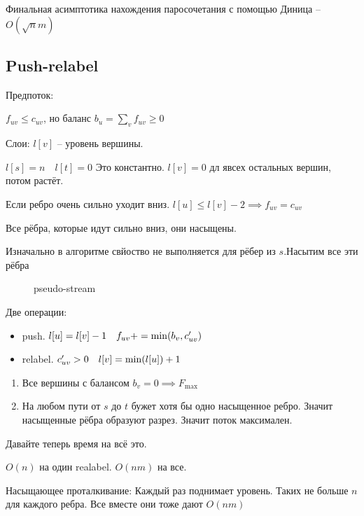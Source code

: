 Финальная асимптотика нахождения паросочетания с помощью Диница -- $O(\sqrt{n}m)$

\subsection{Push-relabel}

\begin{definition}
    Предпоток:

    $f_{uv} \leqslant c_{uv}$, но баланс $b_u = \sum_v f_{uv} \geqslant 0$

    Слои: $l[v] $ -- уровень вершины.

    $l[s] = n\quad l[t] = 0$ Это константно. $l[v] = 0$ дл явсех остальных вершин, потом растёт.
\end{definition}

\begin{property}
    Если ребро очень сильно уходит вниз. $l[u] \leqslant l[v] -2 \implies f_{uv} = c_{uv}$

    Все рёбра, которые идут сильно вниз, они насыщены.
\end{property}

Изначально в алгоритме свйоство не выполняется для рёбер из $s$.Насытим все эти рёбра

\begin{figure}[!ht]
    \centering
    \caption{pseudo-stream}
    \label{fig:pseudo-stream}
\end{figure}

Две операции:
\begin{itemize}
    \item push. $l[u] = l[v] - 1\quad f_{uv} += \min(b_v, c^{\prime}_{uv})$
    \item relabel. $c^{\prime}_{uv} > 0\quad l[v] = \min(l[u]) + 1$
\end{itemize}

\begin{enumerate}
    \item Все вершины с балансом $b_v = 0 \implies F_{\max}$
    \item На любом пути от $s$ до $t$ бужет хотя бы одно насыщенное ребро. Значит насыщенные рёбра образуют разрез. Значит поток максимален.
\end{enumerate}

Давайте теперь время на всё это.

$O(n)$ на один realabel. $O(nm)$ на все.

Насыщающее проталкивание: Каждый раз поднимает уровень. Таких не больше $n$ для каждого ребра. Все вместе они тоже дают $O(nm)$

